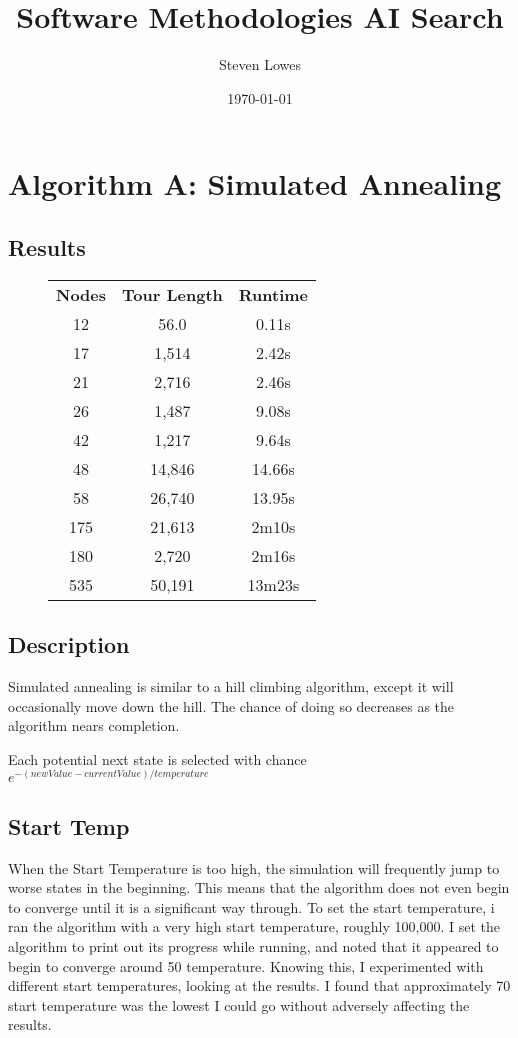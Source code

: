 \documentclass[a4paper, 11pt,table]{article}
\author{Steven Lowes}
\title{Software Methodologies AI Search}
\date{\today{}}
\begin{document}
	
	\section{Algorithm A: Simulated Annealing}
	
	\subsection{Results}
	\begin{figure}
	\label{useCase:annealResults}
	\begin{center}
		\begin{tabu}{|c c c|}
			\textbf{Nodes} & \textbf{Tour Length} & \textbf{Runtime} \\
			12 & 56.0 & 0.11s \\
			17 & 1,514 & 2.42s \\
			21 & 2,716 & 2.46s \\
			26 & 1,487 & 9.08s \\
			42 & 1,217 & 9.64s \\
			48 & 14,846 & 14.66s \\
			58 & 26,740 & 13.95s \\
			175 & 21,613 & 2m10s \\
			180 & 2,720 & 2m16s \\
			535 & 50,191 & 13m23s \\
		\end{tabu}
	\end{center}
\end{figure}
	
	\subsection{Description}
	Simulated annealing is similar to a hill climbing algorithm, except it will occasionally move down the hill. The chance of doing so decreases as the algorithm nears completion.
	
	Each potential next state is selected with chance $e^{-(newValue - currentValue) / temperature}$
	
	\subsection{Start Temp}
	When the Start Temperature is too high, the simulation will frequently jump to worse states in the beginning. This means that the algorithm does not even begin to converge until it is a significant way through. To set the start temperature, i ran the algorithm with a very high start temperature, roughly 100,000. I set the algorithm to print out its progress while running, and noted that it appeared to begin to converge around 50 temperature. Knowing this, I experimented with different start temperatures, looking at the results. I found that approximately 70 start temperature was the lowest I could go without adversely affecting the results.
	
\end{document}

